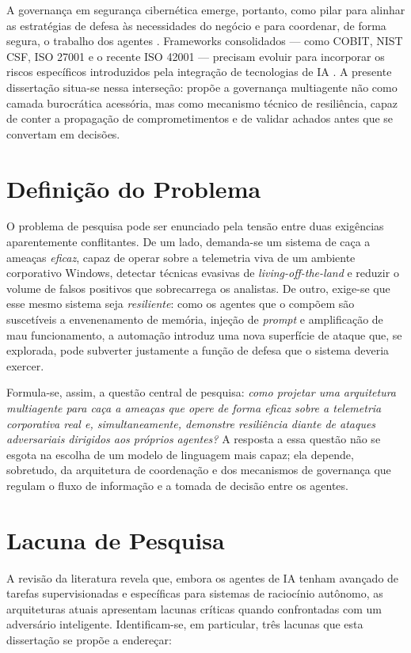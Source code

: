 A governança em segurança cibernética emerge, portanto, como pilar para alinhar
as estratégias de defesa às necessidades do negócio e para coordenar, de forma
segura, o trabalho dos agentes \cite{academia21}. Frameworks consolidados — como
COBIT, NIST CSF, ISO 27001 e o recente ISO 42001 — precisam evoluir para
incorporar os riscos específicos introduzidos pela integração de tecnologias de
IA \cite{McIntosh2024,isaca2025leveraging}. A presente dissertação situa-se
nessa interseção: propõe a governança multiagente não como camada burocrática
acessória, mas como mecanismo técnico de resiliência, capaz de conter a
propagação de comprometimentos e de validar achados antes que se convertam em
decisões.

\section{Definição do Problema}
\label{sec:problema}

O problema de pesquisa pode ser enunciado pela tensão entre duas exigências
aparentemente conflitantes. De um lado, demanda-se um sistema de caça a ameaças
\emph{eficaz}, capaz de operar sobre a telemetria viva de um ambiente corporativo
Windows, detectar técnicas evasivas de \emph{living-off-the-land} e reduzir o
volume de falsos positivos que sobrecarrega os analistas. De outro, exige-se que
esse mesmo sistema seja \emph{resiliente}: como os agentes que o compõem são
suscetíveis a envenenamento de memória, injeção de \emph{prompt} e amplificação
de mau funcionamento, a automação introduz uma nova superfície de ataque que, se
explorada, pode subverter justamente a função de defesa que o sistema deveria
exercer.

Formula-se, assim, a questão central de pesquisa: \emph{como projetar uma
arquitetura multiagente para caça a ameaças que opere de forma eficaz sobre a
telemetria corporativa real e, simultaneamente, demonstre resiliência diante de
ataques adversariais dirigidos aos próprios agentes?} A resposta a essa questão
não se esgota na escolha de um modelo de linguagem mais capaz; ela depende,
sobretudo, da arquitetura de coordenação e dos mecanismos de governança que
regulam o fluxo de informação e a tomada de decisão entre os agentes.

\section{Lacuna de Pesquisa}
\label{sec:lacuna}

A revisão da literatura revela que, embora os agentes de IA tenham avançado de
tarefas supervisionadas e específicas para sistemas de raciocínio autônomo, as
arquiteturas atuais apresentam lacunas críticas quando confrontadas com um
adversário inteligente. Identificam-se, em particular, três lacunas que esta
dissertação se propõe a endereçar:

